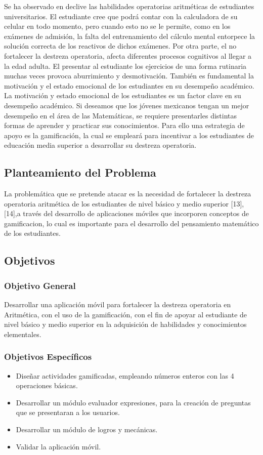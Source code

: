 \documentclass{article}
\begin{document}
Se ha observado en declive las habilidades operatorias aritméticas de estudiantes universitarios\cite{tariq2002decline,carpenter2017psychology,huang2013gamification}. 
El estudiante cree que podrá contar con la calculadora de su celular en todo momento, pero cuando esto no se le permite, como en los exámenes de admisión, la falta del entrenamiento del cálculo mental entorpece la solución correcta de los reactivos 
de dichos exámenes. Por otra parte, el no fortalecer la destreza operatoria, afecta diferentes procesos cognitivos al llegar a la edad adulta\cite{martin2003loss}.
El presentar al estudiante los ejercicios de una forma rutinaria muchas veces provoca aburrimiento y desmotivación. 
También es fundamental la motivación y el estado emocional de los estudiantes en su desempeño académico. La motivación y estado emocional de los estudiantes es un factor clave en su desempeño académico\cite{larrazolo2013habilidades,ryan1997should}. Si deseamos que los jóvenes 
mexicanos tengan un mejor desempeño en el área de las Matemáticas, se requiere presentarles 
distintas formas de aprender y practicar sus conocimientos. Para ello una estrategia de 
apoyo es la gamificación, la cual se empleará para incentivar a los estudiantes de educación 
media superior a desarrollar su destreza operatoria.

\subsection{Planteamiento del Problema}
La problemática que se pretende atacar es la necesidad de fortalecer la destreza operatoria aritmética de los estudiantes de nivel básico y  medio superior [13], [14],a través del desarrollo de aplicaciones móviles que incorporen conceptos de gamificacion, lo cual es importante para el desarrollo del pensamiento matemático de los estudiantes. 
\subsection{Objetivos}
\subsubsection{Objetivo General}
Desarrollar una aplicación móvil para fortalecer la destreza operatoria en Aritmética, con el uso de la gamificación, con el fin de apoyar al estudiante de nivel básico y medio superior en la adquisición de habilidades y conocimientos elementales.

\subsubsection{Objetivos Específicos}
\begin{itemize}
	\item Diseñar actividades gamificadas, empleando números enteros con las 4 operaciones básicas.
	\item Desarrollar un módulo evaluador expresiones, para la creación de preguntas que se presentaran a los usuarios.
	\item Desarrollar un módulo de logros y mecánicas.
	\item Validar la aplicación móvil. 
\end{itemize}
\end{document}
